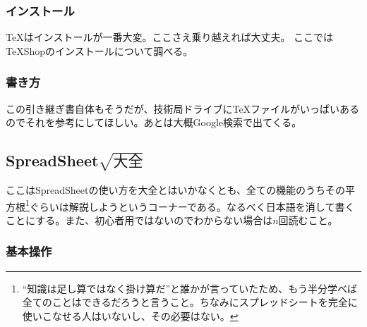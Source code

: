 \documentclass[dvipdfmx,jb5]{jarticle}
\begin{document}
  \subsubsection{インストール}
  \TeX はインストールが一番大変。ここさえ乗り越えれば大丈夫。
  ここではTeXShopのインストールについて調べる。
  \subsubsection{書き方}
  この引き継ぎ書自体もそうだが、技術局ドライブに\TeX ファイルがいっぱいあるのでそれを参考にしてほしい。あとは大概Google検索で出てくる。
  \subsection{SpreadSheet$\sqrt{大全}$}
  ここはSpreadSheetの使い方を大全とはいかなくとも、全ての機能のうちその平方根\footnote{``知識は足し算ではなく掛け算だ''と誰かが言っていたため、もう半分学べば全てのことはできるだろうと言うこと。ちなみにスプレッドシートを完全に使いこなせる人はいないし、その必要はない。}ぐらいは解説しようというコーナーである。なるべく日本語を消して書くことにする。また、初心者用ではないのでわからない場合は$n$回読むこと。
  \subsubsection{基本操作}
  
\end{document}
